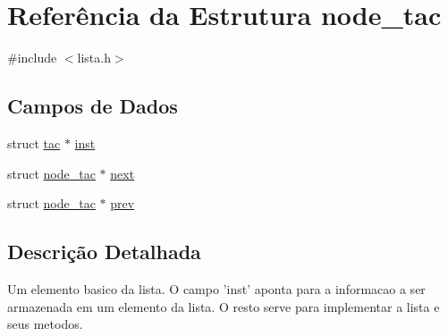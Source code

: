 \hypertarget{structnode__tac}{
\section{Referência da Estrutura node\_\-tac}
\label{structnode__tac}
}


{\ttfamily \#include $<$lista.h$>$}\subsection*{Campos de Dados}
\begin{DoxyCompactItemize}
\item 
struct \hyperlink{structtac}{tac} $\ast$ \hyperlink{structnode__tac_a30e49a29ec5242fba75f64e739cd8539}{inst}
\item 
struct \hyperlink{structnode__tac}{node\_\-tac} $\ast$ \hyperlink{structnode__tac_aa67e7998f0070fc240f79534788b7587}{next}
\item 
struct \hyperlink{structnode__tac}{node\_\-tac} $\ast$ \hyperlink{structnode__tac_a7ffb36df18c662a79e17e0c01d630aff}{prev}
\end{DoxyCompactItemize}


\subsection{Descrição Detalhada}
Um elemento basico da lista. O campo 'inst' aponta para a informacao a ser armazenada em um elemento da lista. O resto serve para implementar a lista e seus metodos. 


